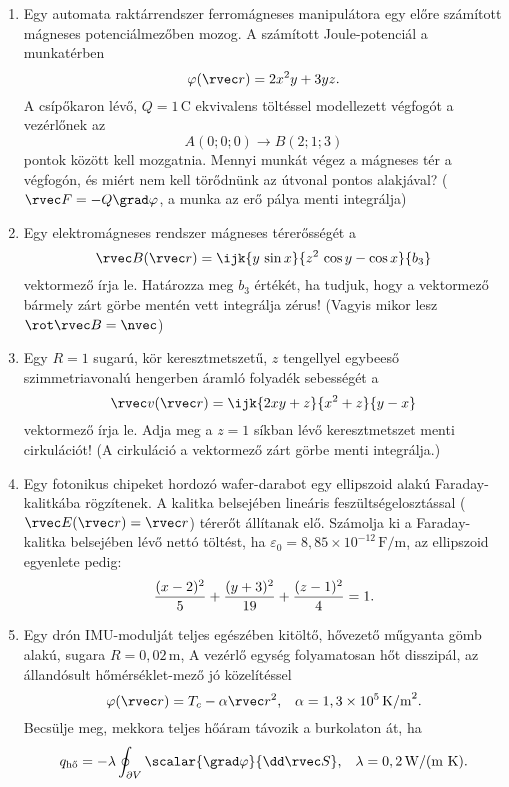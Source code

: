 \documentclass[a4paper, 12pt]{scrartcl}
\newcommand\coordv{\rvec r}
\begin{document}
\begin{enumerate}
  \item Egy automata raktárrendszer ferromágneses manipulátora egy előre
        számított mágneses potenciálmezőben mozog. A számított Joule-potenciál a
        munkatérben
        $$
          \varphi(\coordv) = 2x^2 y + 3yz
          \text.
        $$
        A csípőkaron lévő, $Q = 1\,\text{C}$ ekvivalens töltéssel modellezett
        végfogót a vezérlőnek az
        $$
          A(0;0;0) \rightarrow B(2;1;3)
        $$
        pontok között kell mozgatnia. Mennyi munkát végez a mágneses tér a
        végfogón, és miért nem kell törődnünk az útvonal pontos alakjával?
        ($\rvec F = -Q \grad \varphi$, a munka az erő pálya menti integrálja)

  \item Egy elektromágneses rendszer mágneses térerősségét a
        $$
          \rvec B(\coordv) = \ijk{y \, \sin x}{z^2 \, \cos y - \cos x}{b_3}
        $$
        vektormező írja le. Határozza meg $b_3$ értékét, ha tudjuk, hogy
        a vektormező bármely zárt görbe mentén vett integrálja zérus!
        (Vagyis mikor lesz $\rot \rvec B = \nvec$)

  \item Egy $R = 1$ sugarú, kör keresztmetszetű, $z$ tengellyel egybeeső
        szimmetriavonalú hengerben áramló folyadék sebességét a
        $$
          \rvec v(\coordv) = \ijk{2xy + z}{x^2 + z}{y - x}
        $$
        vektormező írja le. Adja meg a $z = 1$ síkban lévő keresztmetszet
        menti cirkulációt!
        (A cirkuláció a vektormező zárt görbe menti integrálja.)

  \item Egy fotonikus chipeket hordozó wafer-darabot egy ellipszoid alakú
        Faraday-kalitkába rögzítenek. A kalitka belsejében lineáris
        feszültségelosztással ($\rvec E(\coordv) = \coordv$) térerőt állítanak
        elő. Számolja ki a Faraday-kalitka belsejében lévő nettó töltést, ha
        $\varepsilon_0 = 8,85 \times 10^{-12} \, \text{F/m}$, az ellipszoid
        egyenlete pedig:
        $$
          \frac{(x - 2)^2}{5} + \frac{(y + 3)^2}{19} + \frac{(z - 1)^2}{4} = 1
          \text.
        $$

  \item Egy drón IMU-modulját teljes egészében kitöltő, hővezető műgyanta gömb
        alakú, sugara $R = 0,02 \, \text{m}$, A vezérlő egység folyamatosan
        hőt disszipál, az állandósult hő\-mér\-sék\-let-mező jó közelítéssel
        $$
          \varphi(\coordv) = T_c - \alpha \rvec r^2
          \text, \quad
          \alpha = 1,3 \times 10^5 \,\text{K/m}^2
          \text.
        $$
        Becsülje meg, mekkora teljes hőáram távozik a burkolaton át, ha
        $$
          q_{\text{hő}}
          = -\lambda \oint_{\partial V} \scalar{\grad \varphi}{\dd \rvec S}
          \text,\quad
          \lambda = 0,2 \, \text{W/(m K)}
          \text.
        $$
\end{enumerate}
\end{document}
